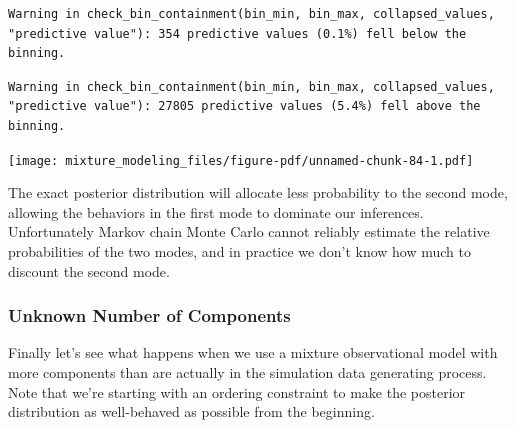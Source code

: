 \documentclass[
  letterpaper,
  DIV=11,
  numbers=noendperiod]{scrartcl}
\newenvironment{Shaded}{\begin{snugshade}}{\end{snugshade}}
\newcommand{\AttributeTok}[1]{\textcolor[rgb]{0.40,0.45,0.13}{#1}}
\newcommand{\ControlFlowTok}[1]{\textcolor[rgb]{0.00,0.23,0.31}{#1}}
\newcommand{\DecValTok}[1]{\textcolor[rgb]{0.68,0.00,0.00}{#1}}
\newcommand{\FloatTok}[1]{\textcolor[rgb]{0.68,0.00,0.00}{#1}}
\newcommand{\FunctionTok}[1]{\textcolor[rgb]{0.28,0.35,0.67}{#1}}
\newcommand{\NormalTok}[1]{\textcolor[rgb]{0.00,0.23,0.31}{#1}}
\newcommand{\OtherTok}[1]{\textcolor[rgb]{0.00,0.23,0.31}{#1}}
\newcommand{\SpecialCharTok}[1]{\textcolor[rgb]{0.37,0.37,0.37}{#1}}
\newcommand{\StringTok}[1]{\textcolor[rgb]{0.13,0.47,0.30}{#1}}
\begin{document}
\begin{Shaded}
\end{Shaded}

\begin{verbatim}
Warning in check_bin_containment(bin_min, bin_max, collapsed_values,
"predictive value"): 354 predictive values (0.1%) fell below the binning.
\end{verbatim}

\begin{verbatim}
Warning in check_bin_containment(bin_min, bin_max, collapsed_values,
"predictive value"): 27805 predictive values (5.4%) fell above the binning.
\end{verbatim}

\texttt{[image: mixture\_modeling\_files/figure-pdf/unnamed-chunk-84-1.pdf]}

The exact posterior distribution will allocate less probability to the
second mode, allowing the behaviors in the first mode to dominate our
inferences. Unfortunately Markov chain Monte Carlo cannot reliably
estimate the relative probabilities of the two modes, and in practice we
don't know how much to discount the second mode.

\subsubsection{Unknown Number of
Components}\label{unknown-number-of-components}

Finally let's see what happens when we use a mixture observational model
with more components than are actually in the simulation data generating
process. Note that we're starting with an ordering constraint to make
the posterior distribution as well-behaved as possible from the
beginning.
\end{document}
